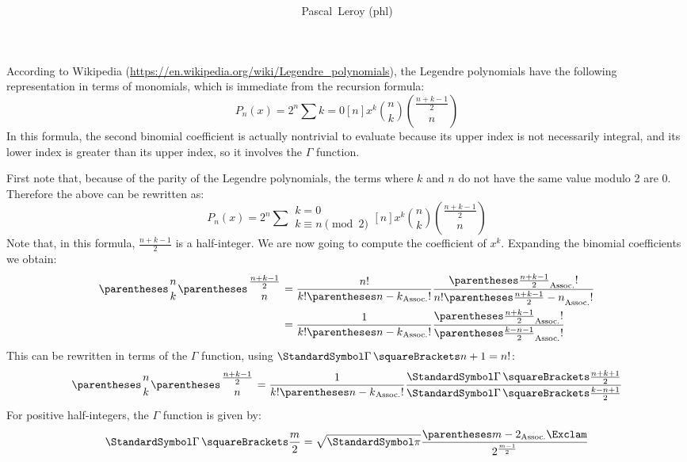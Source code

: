 \documentclass[10pt, a4paper, oneside]{basestyle}
\title{%
\textdisplay{%
Explicit representation of Legendre polynomials%
}%
}
\author{Pascal~Leroy (phl)}
\begin{document}
\maketitle
\noindent
According to Wikipedia (\url{https://en.wikipedia.org/wiki/Legendre_polynomials}), the Legendre polynomials have the following representation in terms of monomials, which is immediate from the recursion formula:
\begin{equation*}
P_n(x) = 2^n \sum{k = 0}[n] x^k \binom{n}{k} \binom{\frac{n + k - 1}{2}}{n}
\end{equation*}
In this formula, the second binomial coefficient is actually nontrivial to evaluate because its upper index is not necessarily integral, and its lower index is greater than its upper index, so it involves the $\Gamma$ function.

First note that, because of the parity of the Legendre polynomials, the terms where $k$ and $n$ do not have the same value modulo 2 are 0.  Therefore the above can be rewritten as:
\begin{equation*}
P_n(x) = 2^n \sum{\substack{k = 0\\ k \equiv n \pmod 2}}[n] x^k \binom{n}{k} \binom{\frac{n + k - 1}{2}}{n}
\end{equation*}
Note that, in this formula, $\frac{n + k - 1}{2}$ is a half-integer.  We are now going to compute the coefficient of $x^k$.  Expanding the binomial coefficients we obtain:
\begin{align*}
\binom{n}{k} \binom{\frac{n + k - 1}{2}}{n} &=
  \frac{\Factorial{n}}
       {\Factorial{k}\Factorial{\pa{n - k}}}
  \frac{\Factorial{\pa{\frac{n + k - 1}{2}}}}
       {\Factorial{n}\Factorial{\pa{\frac{n + k - 1}{2} - n}}}\\
&=
  \frac{1}
       {\Factorial{k}\Factorial{\pa{n - k}}}
  \frac{\Factorial{\pa{\frac{n + k - 1}{2}}}}
       {\Factorial{\pa{\frac{k - n - 1}{2}}}}
\end{align*}
This can be rewritten in terms of the $\Gamma$ function, using $\Gamma\of{n + 1} = \Factorial{n}$:
\begin{equation}
\label{coefficientusinggamma}
\binom{n}{k} \binom{\frac{n + k - 1}{2}}{n} =
  \frac{1}
       {\Factorial{k}\Factorial{\pa{n - k}}}
  \frac{\Gamma\of{\frac{n + k + 1}{2}}}
       {\Gamma\of{\frac{k - n + 1}{2}}}
\end{equation}
For positive half-integers, the $\Gamma$ function is given by:
\begin{equation}
\label{gammahalfinteger}
\Gamma\of{\frac{m}{2}} =
  \sqrt{\Pi}
  \frac{\DoubleFactorial{\pa{m - 2}}}{2^{\frac{m - 1}{2}}}
\end{equation}
\end{document}
